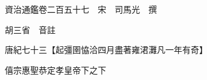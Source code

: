 










 


 
 


 

  
  
  
  
  





  
  
  
  
  
 
  

  

  
  
  



  

 
 

  
   




  

  
  


  　　資治通鑑卷二百五十七　宋　司馬光　撰

　　胡三省　音註

　　唐紀七十三【起彊圉恊洽四月盡著雍涒灘凡一年有奇】

　　僖宗惠聖恭定孝皇帝下之下

